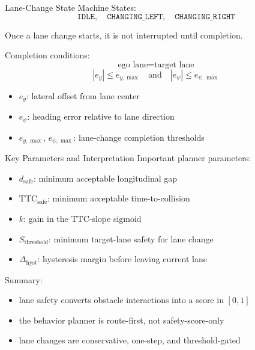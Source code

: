 \documentclass{beamer}
\begin{document}
\begin{frame}{Lane-Change State Machine}
  States:
  \[
    \texttt{IDLE}, \quad \texttt{CHANGING\_LEFT}, \quad \texttt{CHANGING\_RIGHT}
  \]

  Once a lane change starts, it is not interrupted until completion.

  Completion conditions:
  \[
    \text{ego lane} = \text{target lane}
  \]
  \[
    |e_y| \le e_{y,\max}
    \quad \text{and} \quad
    |e_\psi| \le e_{\psi,\max}
  \]

  \begin{itemize}
    \item \(e_y\): lateral offset from lane center
    \item \(e_\psi\): heading error relative to lane direction
    \item \(e_{y,\max}\), \(e_{\psi,\max}\): lane-change completion thresholds
  \end{itemize}
\end{frame}

\begin{frame}{Key Parameters and Interpretation}
  Important planner parameters:
  \begin{itemize}
    \item \(d_{\text{safe}}\): minimum acceptable longitudinal gap
    \item \(\text{TTC}_{\text{safe}}\): minimum acceptable time-to-collision
    \item \(k\): gain in the TTC-slope sigmoid
    \item \(S_{\text{threshold}}\): minimum target-lane safety for lane change
    \item \(\Delta_{\text{hyst}}\): hysteresis margin before leaving current lane
  \end{itemize}

  \vspace{0.5em}
  Summary:
  \begin{itemize}
    \item lane safety converts obstacle interactions into a score in \([0,1]\)
    \item the behavior planner is route-first, not safety-score-only
    \item lane changes are conservative, one-step, and threshold-gated
  \end{itemize}
\end{frame}
\end{document}
